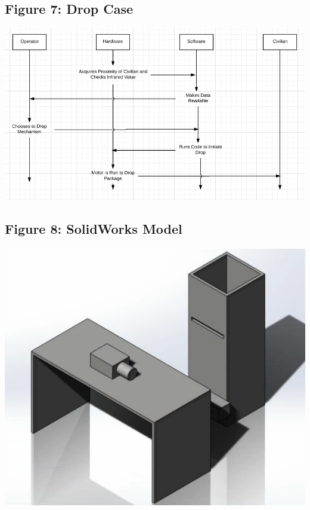 \documentclass{article}
\begin{document}
\subsection{Figure 7: Drop Case}
\begin{center}{ \includegraphics[width=\textwidth]{DropCase.png}}\end{center}

\subsection{Figure 8: SolidWorks Model}
\begin{center}{ \includegraphics[width=\textwidth]{Solidworks.png}}\end{center}
\end{document}
